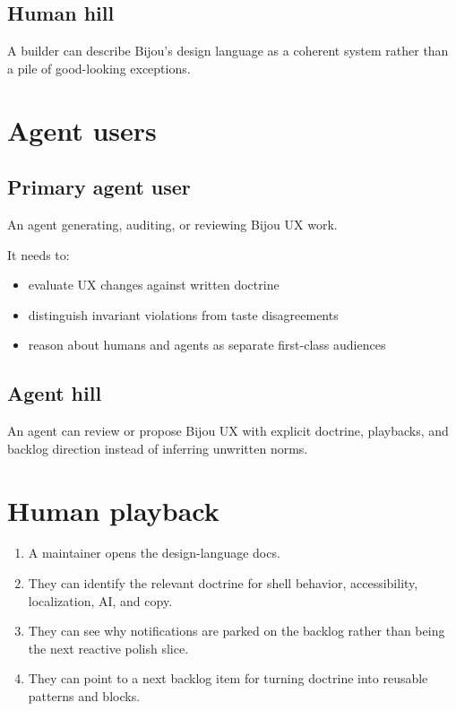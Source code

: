 \subsection{Human hill}\label{record-168-human-hill}

A builder can describe Bijou's design language as a coherent system rather than a pile of good-looking exceptions.

\section{Agent users}\label{record-168-agent-users}

\subsection{Primary agent user}\label{record-168-primary-agent-user}

An agent generating, auditing, or reviewing Bijou UX work.

It needs to:

\begin{itemize}
\tightlist
\item
  evaluate UX changes against written doctrine
\item
  distinguish invariant violations from taste disagreements
\item
  reason about humans and agents as separate first-class audiences
\end{itemize}

\subsection{Agent hill}\label{record-168-agent-hill}

An agent can review or propose Bijou UX with explicit doctrine, playbacks, and backlog direction instead of inferring unwritten norms.

\section{Human playback}\label{record-168-human-playback}

\begin{enumerate}
\def\labelenumi{\arabic{enumi}.}
\tightlist
\item
  A maintainer opens the design-language docs.
\item
  They can identify the relevant doctrine for shell behavior, accessibility, localization, AI, and copy.
\item
  They can see why notifications are parked on the backlog rather than being the next reactive polish slice.
\item
  They can point to a next backlog item for turning doctrine into reusable patterns and blocks.
\end{enumerate}


